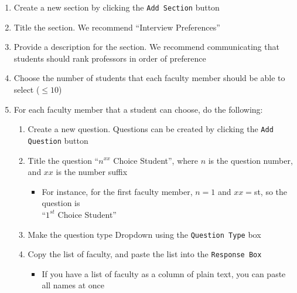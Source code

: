 \begin{enumerate}
		
	\item Create a new section by clicking the \texttt{Add Section} button
	\item Title the section.  We recommend ``Interview Preferences''
	\item Provide a description for the section.  We recommend communicating that students should rank professors in order of preference
	\item Choose the number of students that each faculty member should be able to select ($\le 10$)
	\item For each faculty member that a student can choose, do the following:
		\begin{enumerate}
			\item Create a new question. Questions can be created by clicking the \texttt{Add Question} button
			\item Title the question ``$n^{xx}$ Choice Student'', where $n$ is the question number, and $xx$ is the number suffix
				\begin{itemize}
					\item For instance, for the first faculty member, $n=1$ and $xx=$st, so the question is\\ ``$1^{st}$ Choice Student''
				\end{itemize}
			\item Make the question type Dropdown using the \texttt{Question Type} box
			\item Copy the list of faculty, and paste the list into the \texttt{Response Box}
				\begin{itemize}
					\item If you have a list of faculty as a column of plain text, you can paste all names at once
				\end{itemize}
		\end{enumerate}

\end{enumerate}






